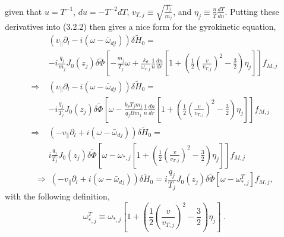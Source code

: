 \documentclass[12pt]{article}
\numberwithin{equation}{subsection}
\begin{document}
given that $u = T^{-1}$, $du = -T^{-2}dT$, $v_{T,j} \equiv \sqrt{\frac{T_j}{m_j}}$, and $\eta_j \equiv \frac{n}{T}\frac{dT}{dn}$. Putting these
derivatives into (3.2.2) then gives a nice form for the gyrokinetic equation,
   \begin{equation}
   \begin{aligned}
      &(v_\parallel\partial_l - i(\omega - \bar{\omega}_{dj}))\delta\widetilde{H}_0 =               \\ &-i\frac{q_j}{m_j}J_0(z_j)\delta\widetilde{\Phi}
          [-\frac{m_j}{T_j}\omega + \frac{k_\theta}{\omega_{c,j}}\frac{1}{n}\frac{dn}{dr}[1 + (\frac{1}{2}\left(\frac{v}{v_{T,j}}\right)^2 - \frac{3}{2})\eta_j]]f_{M,j} \\
      \Rightarrow\; &(v_\parallel\partial_l - i(\omega - \bar{\omega}_{dj}))\delta\widetilde{H}_0 = \\ &-i\frac{q_j}{T_j}J_0(z_j)\delta\widetilde{\Phi}
          [\omega - \frac{k_\theta T_j m_j}{q_j B m_j}\frac{1}{n}\frac{dn}{dr}[1 + (\frac{1}{2}\left(\frac{v}{v_{T,j}}\right)^2 - \frac{3}{2})\eta_j]]f_{M,j}           \\
      \Rightarrow\; &(-v_\parallel\partial_l + i(\omega - \bar{\omega}_{dj}))\delta\widetilde{H}_0 = \\ &i\frac{q_j}{T_j}J_0(z_j)\delta\widetilde{\Phi}
          [\omega - \omega_{*,j}[1 + (\frac{1}{2}\left(\frac{v}{v_{T,j}}\right)^2- \frac{3}{2})\eta_j]]f_{M,j}
   \end{aligned}
   \end{equation}
   \begin{equation}
      \Rightarrow\; (-v_\parallel\partial_l + i(\omega - \bar{\omega}_{dj}))\delta\widetilde{H}_0
      = i\frac{q_j}{T_j}J_0(z_j)\delta\widetilde{\Phi}[\omega - \omega_{*,j}^T]f_{M,j},
   \end{equation}
with the following definition,
   \begin{equation}
      \omega_{*,j}^T \equiv \omega_{*,j}[1 + (\frac{1}{2}\left(\frac{v}{v_{T,j}}\right)^2-\frac{3}{2})\eta_j]\;.
   \end{equation}
\end{document}

